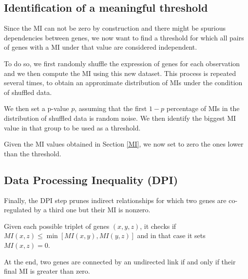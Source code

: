 \subsection{Identification of a meaningful threshold}
Since the MI can not be zero by construction
and there might be spurious dependencies between genes,
we now want to find a threshold for which
all pairs of genes with a MI under that value are considered independent.

To do so, we first randomly shuffle the expression of genes for each observation
and we then compute the MI using this new dataset.
This process is repeated several times,
to obtain an approximate distribution of MIs under the condition of shuffled data.

We then set a p-value $p$, assuming that the first $1-p$ percentage of
MIs in the distribution of shuffled data is random noise.
We then identify the biggest MI value in that group to be used as a threshold.

Given the MI values obtained in Section \ref{MI},
we now set to zero the ones lower than the threshold.

\subsection{Data Processing Inequality (DPI)}
Finally, the DPI step prunes indirect relationships for which two
genes are co-regulated by a third one but their MI is nonzero.

Given each possible triplet of genes $(x, y, z)$,
it checks if $\mathit{MI}(x, z) \leq \min[\mathit{MI}(x, y), \mathit{MI}(y, z)]$
and in that case it sets $\mathit{MI}(x, z) = 0$.

At the end, two genes are connected by an undirected link if and only if
their final MI is greater than zero.
